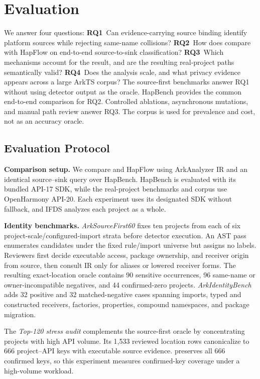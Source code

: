 \section{Evaluation}
\label{sec:evaluation}

We answer four questions:
\textbf{RQ1}~Can evidence-carrying source binding identify platform sources while rejecting same-name collisions?
\textbf{RQ2}~How does \mytool compare with HapFlow on end-to-end source-to-sink classification?
\textbf{RQ3}~Which mechanisms account for the result, and are the resulting real-project paths semantically valid?
\textbf{RQ4}~Does the analysis scale, and what privacy evidence appears across a large ArkTS corpus?
The source-first benchmarks answer RQ1 without using detector output as the oracle. HapBench provides the common end-to-end comparison for RQ2. Controlled ablations, asynchronous mutations, and manual path review answer RQ3. The corpus is used for prevalence and cost, not as an accuracy oracle.

\subsection{Evaluation Protocol}
\label{subsec:eval_design}

\textbf{Comparison setup.}
We compare \mytool and HapFlow using ArkAnalyzer IR and an identical source--sink query over HapBench. HapBench is evaluated with its bundled API-17 SDK, while the real-project benchmarks and corpus use OpenHarmony API-20. Each experiment uses its designated SDK without fallback, and IFDS analyzes each project as a whole.

\textbf{Identity benchmarks.}
\emph{ArkSourceFirst60} fixes ten projects from each of six project-scale/configured-import strata before detector execution. An AST pass enumerates candidates under the fixed rule/import universe but assigns no labels. Reviewers first decide executable access, package ownership, and receiver origin from source, then consult IR only for aliases or lowered receiver forms. The resulting exact-location oracle contains 90 sensitive occurrences, 96 same-name or owner-incompatible negatives, and 44 confirmed-zero projects. \emph{ArkIdentityBench} adds 32 positive and 32 matched-negative cases spanning imports, typed and constructed receivers, factories, properties, compound namespaces, and package migration.

The \emph{Top-120 stress audit} complements the source-first oracle by concentrating projects with high API volume. Its 1,533 reviewed location rows canonicalize to 666 project--API keys with executable source evidence. \mytool preserves all 666 confirmed keys, so this experiment measures confirmed-key coverage under a high-volume workload.

